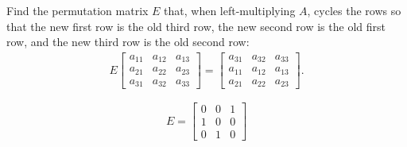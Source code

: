 \documentclass[reqno]{exam}
\begin{document}
\begin{questions}
  \question[5]
    Find the permutation matrix $E$ that, when left-multiplying $A$, cycles the rows so that the new first row is the old third row, the new second row is the old first row, and the new third row is the old second row:
    \begin{align*}
      E \begin{bmatrix}
          a_{11} & a_{12} & a_{13} \\
          a_{21} & a_{22} & a_{23} \\
          a_{31} & a_{32} & a_{33}
        \end{bmatrix}
      =
      \begin{bmatrix}
        a_{31} & a_{32} & a_{33} \\
        a_{11} & a_{12} & a_{13} \\
        a_{21} & a_{22} & a_{23}
      \end{bmatrix}.
    \end{align*}
    \begin{solution}
      $$E = \begin{bmatrix} 0 & 0 & 1 \\ 1 & 0 & 0 \\ 0 & 1 & 0 \end{bmatrix}$$
    \end{solution}
    \vfill 



\end{questions}
\end{document}
